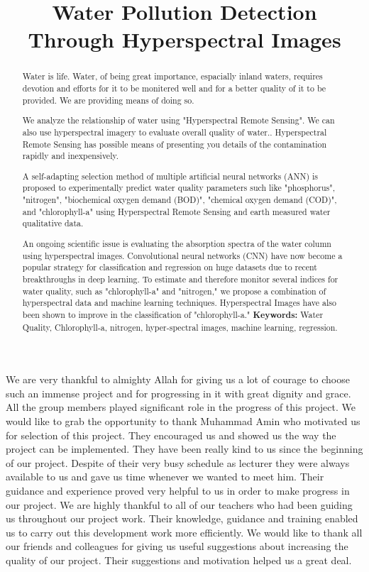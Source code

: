 \documentclass{fast-nuces-bs}
\title{Water Pollution Detection Through Hyperspectral Images}
\begin{document}
\begin{acknowledgements}
	We are very thankful to almighty Allah for giving us a lot of courage to choose such an immense project
and for progressing in it with great dignity and grace. All the group members played significant role
in the progress of this project. We would like to grab the opportunity to thank Muhammad Amin who
motivated us for selection of this project. They encouraged us and showed us the way the project can be
implemented. They have been really kind to us since the beginning of our project. Despite of their very
busy schedule as lecturer they were always available to us and gave us time whenever we wanted to meet
him. Their guidance and experience proved very helpful to us in order to make progress in our project.
We are highly thankful to all of our teachers who had been guiding us throughout our project work.
Their knowledge, guidance and training enabled us to carry out this development work more efficiently.
We would like to thank all our friends and colleagues for giving us useful suggestions about increasing
the quality of our project. Their suggestions and motivation helped us a great deal.
\end{acknowledgements}

\begin{abstract}
Water is life. Water, of being great importance, espacially inland waters, requires devotion and efforts for it to be monitered well and for a better quality of it to be provided. We are providing means of doing so.

We analyze the relationship of water using "Hyperspectral Remote Sensing". We can also use hyperspectral imagery to evaluate overall quality of water.. Hyperspectral Remote Sensing has possible means of presenting you details of the contamination rapidly and inexpensively. 

A self-adapting selection method of multiple artificial neural networks (ANN) is proposed to experimentally predict water quality parameters such like "phosphorus", "nitrogen", "biochemical oxygen demand (BOD)", "chemical oxygen demand (COD)", and "chlorophyll-a" using Hyperspectral Remote Sensing and earth measured water qualitative data.

An ongoing scientific issue is evaluating the absorption spectra of the water column using hyperspectral images. Convolutional neural networks (CNN) have now become a popular strategy for classification and regression on huge datasets due to recent breakthroughs in deep learning. To estimate and therefore monitor several indices for water quality, such as "chlorophyll-a" and "nitrogen," we propose a combination of hyperspectral data and machine learning techniques. Hyperspectral Images have also been shown to improve in the classification of "chlorophyll-a." 
\textbf{Keywords:}  Water Quality, Chlorophyll-a, nitrogen, hyper-spectral images, machine learning, regression.


\end{abstract}








%


 
\end{document}
